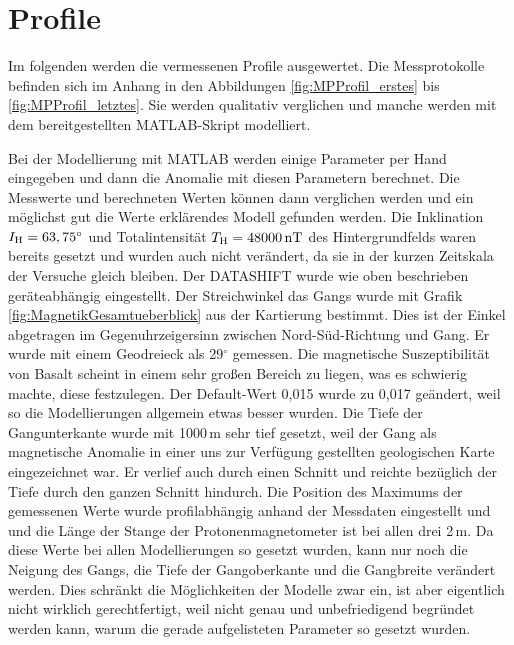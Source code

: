 \section{Profile}

Im folgenden werden die vermessenen Profile ausgewertet. Die Messprotokolle befinden sich im Anhang in den Abbildungen \ref{fig:MPProfil_erstes} bis \ref{fig:MPProfil_letztes}. Sie werden qualitativ verglichen und manche werden mit dem bereitgestellten MATLAB-Skript modelliert.

Bei der Modellierung mit MATLAB werden einige Parameter per Hand eingegeben und dann die Anomalie mit diesen Parametern berechnet. Die Messwerte und berechneten Werten können dann verglichen werden und ein möglichst gut die Werte erklärendes Modell gefunden werden. Die Inklination $I_{\mathrm{H}}=63,75^\circ$ und Totalintensität $T_{\mathrm{H}}=48000\,\mathrm{nT}$ des Hintergrundfelds waren bereits gesetzt und wurden auch nicht verändert, da sie in der kurzen Zeitskala der Versuche gleich bleiben. Der DATASHIFT wurde wie oben beschrieben geräteabhängig eingestellt. Der Streichwinkel das Gangs wurde mit Grafik \ref{fig:MagnetikGesamtueberblick} aus der Kartierung bestimmt. Dies ist der Einkel abgetragen im Gegenuhrzeigersinn zwischen Nord-Süd-Richtung und Gang. Er wurde mit einem Geodreieck als 29$^\circ$ gemessen. Die magnetische Suszeptibilität von Basalt scheint in einem sehr großen Bereich zu liegen, was es schwierig machte, diese festzulegen. Der Default-Wert 0,015 wurde zu 0,017 geändert, weil so die Modellierungen allgemein etwas besser wurden. Die Tiefe der Gangunterkante wurde mit 1000\,m sehr tief gesetzt, weil der Gang als magnetische Anomalie in einer uns zur Verfügung gestellten geologischen Karte eingezeichnet war. Er verlief auch durch einen Schnitt und reichte bezüglich der Tiefe durch den ganzen Schnitt hindurch. Die Position des Maximums der gemessenen Werte wurde profilabhängig anhand der Messdaten eingestellt und und die Länge der Stange der Protonenmagnetometer ist bei allen drei 2\,m. Da diese Werte bei allen Modellierungen so gesetzt wurden, kann nur noch die Neigung des Gangs, die Tiefe der Gangoberkante und die Gangbreite verändert werden.
Dies schränkt die Möglichkeiten der Modelle zwar ein, ist aber eigentlich nicht wirklich gerechtfertigt, weil nicht genau und unbefriedigend begründet werden kann, warum die gerade aufgelisteten Parameter so gesetzt wurden.


